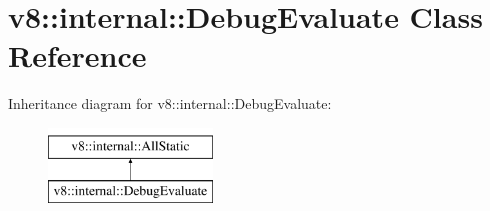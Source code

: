 \hypertarget{classv8_1_1internal_1_1DebugEvaluate}{}\section{v8\+:\+:internal\+:\+:Debug\+Evaluate Class Reference}
\label{classv8_1_1internal_1_1DebugEvaluate}
Inheritance diagram for v8\+:\+:internal\+:\+:Debug\+Evaluate\+:\begin{figure}[H]
\begin{center}
\leavevmode
\includegraphics[height=2.000000cm]{classv8_1_1internal_1_1DebugEvaluate}
\end{center}
\end{figure}
